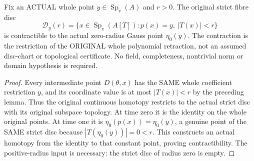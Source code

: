 \begin{theorem}
\label{analytic:actual-strict-fibre-disc-contraction}
\leanok
{}
Fix an ACTUAL whole point $y\in\operatorname{Sp}_v(A)$ and $r>0$. The
original strict fibre disc
\[
 \mathcal D_y(r)=\{x\in\operatorname{Sp}_v(A[T]):p(x)=y,\ |T(x)|<r\}
\]
is contractible to the actual zero-radius Gauss point $\eta_0(y)$. The
contraction is the restriction of the ORIGINAL whole polynomial retraction,
not an assumed disc-chart or topological certificate. No field,
completeness, nontrivial norm or domain hypothesis is required.
\end{theorem}
\begin{proof}
Every intermediate point $D(\theta,x)$ has the SAME whole coefficient
restriction $y$, and its coordinate value is at most $|T(x)|<r$ by the
preceding lemma. Thus the original continuous homotopy restricts to the
actual strict disc with its original subspace topology. At time zero it is
the identity on the whole original points. At time one it is
$\eta_0(p(x))=\eta_0(y)$, a genuine point of the SAME strict disc because
$|T(\eta_0(y))|=0<r$. This constructs an actual homotopy from the identity
to that constant point, proving contractibility. The positive-radius input
is necessary: the strict disc of radius zero is empty.
\end{proof}
